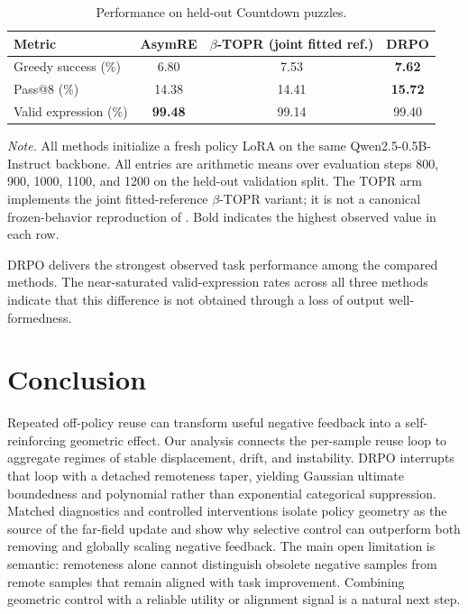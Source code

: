 \documentclass{article}
\theoremstyle{plain}
\theoremstyle{definition}
\theoremstyle{remark}
\begin{document}
\begin{table}[t]
\centering
\caption{Performance on held-out Countdown puzzles.}
\label{tab:countdown_performance}

\small
\renewcommand{\arraystretch}{1.10}
\setlength{\tabcolsep}{5.0pt}

\begin{tabular*}{\columnwidth}{@{\extracolsep{\fill}}lccc}
\toprule
Metric
&
AsymRE
&
\makecell{\(\beta\)-TOPR\\(joint fitted ref.)}
&
\textbf{DRPO}
\\
\midrule

Greedy success (\%)
& 6.80
& 7.53
& \textbf{7.62}
\\

Pass@8 (\%)
& 14.38
& 14.41
& \textbf{15.72}
\\

Valid expression (\%)
& \textbf{99.48}
& 99.14
& 99.40
\\

\bottomrule
\end{tabular*}

\vspace{2pt}

\begin{minipage}{\columnwidth}
\small
\textit{Note.}
All methods initialize a fresh policy LoRA on the same
Qwen2.5-0.5B-Instruct backbone. All entries are arithmetic means over
evaluation steps 800, 900, 1000, 1100, and 1200 on the held-out
validation split. The TOPR arm implements the joint fitted-reference
\(\beta\)-TOPR variant; it is not a canonical frozen-behavior
reproduction of \citet{leroux2025tapered}. Bold indicates the highest
observed value in each row.
\end{minipage}

\end{table}

DRPO delivers the strongest observed task performance among the
compared methods. The near-saturated valid-expression rates across all
three methods indicate that this difference is not obtained through a
loss of output well-formedness.

\section{Conclusion}

Repeated off-policy reuse can transform useful negative feedback into a
self-reinforcing geometric effect. Our analysis connects the per-sample reuse
loop to aggregate regimes of stable displacement, drift, and instability.
DRPO interrupts that loop with a detached remoteness taper, yielding Gaussian
ultimate boundedness and polynomial rather than exponential categorical
suppression. Matched diagnostics and controlled interventions isolate policy
geometry as the source of the far-field update and show why selective control
can outperform both removing and globally scaling negative feedback. The main
open limitation is semantic: remoteness alone cannot distinguish obsolete
negative samples from remote samples that remain aligned with task improvement.
Combining geometric control with a reliable utility or alignment signal is a
natural next step.
\end{document}
